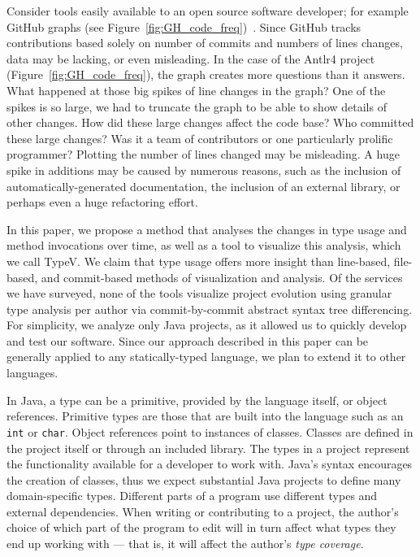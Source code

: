 Consider tools easily available to an open source software developer; for example GitHub graphs (see Figure~\ref{fig:GH_code_freq})~\cite{github-graphs}. Since GitHub tracks contributions based solely on number of commits and numbers of lines changes, data may be lacking, or even misleading. In the case of the Antlr4 project (Figure~\ref{fig:GH_code_freq}), the graph creates more questions than it answers. What happened at those big spikes of line changes in the graph? One of the spikes is so large, we had to truncate the graph to be able to show details of other changes. How did these large changes affect the code base? Who committed these large changes? Was it a team of contributors or one particularly prolific programmer? Plotting the number of lines changed may be misleading. A huge spike in additions may be caused by numerous reasons, such as the inclusion of automatically-generated documentation, the inclusion of an external library, or perhaps even a huge refactoring effort.

In this paper, we propose a method that analyses the changes in type usage and method invocations over time, as well as a tool to visualize this analysis, which we call TypeV. We claim that type usage offers more insight than line-based, file-based, and commit-based methods of visualization and analysis. Of the services we have surveyed, none of the tools visualize project evolution using granular type analysis per author via commit-by-commit abstract syntax tree differencing. For simplicity, we analyze only Java projects, as it allowed us to quickly develop and test our software. Since our approach described in this paper can be generally applied to any statically-typed language, we plan to extend it to other languages.

In Java, a type can be a primitive, provided by the language itself, or object references. Primitive types are those that are built into the language such as an \texttt{int} or \texttt{char}. Object references point to instances of classes. Classes are defined in the project itself or through an included library. The types in a project represent the functionality available for a developer to work with. Java's syntax encourages the creation of classes, thus we expect substantial Java projects to define many domain-specific types. Different parts of a program use different types and external dependencies. When writing or contributing to a project, the author's choice of which part of the program to edit will in turn affect what types they end up working with --- that is, it will affect the author's \emph{type coverage}.

